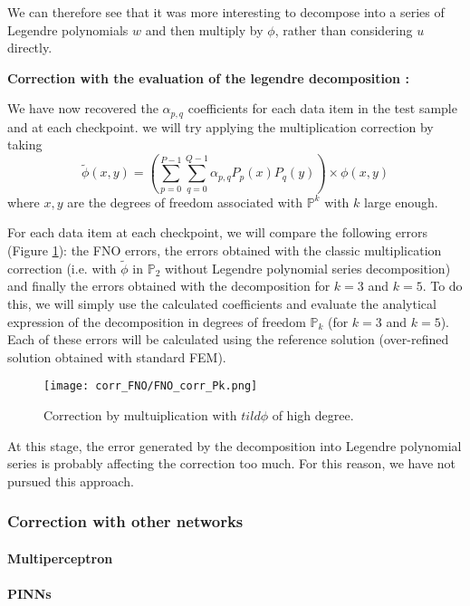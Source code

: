 We can therefore see that it was more interesting to decompose into a series of Legendre polynomials $w$ and then multiply by $\phi$, rather than considering $u$ directly.

\textbf{Correction with the evaluation of the legendre decomposition :}

We have now recovered the $\alpha_{p,q}$ coefficients for each data item in the test sample and at each checkpoint. we will try applying the multiplication correction by taking 
\begin{equation*}
	\tilde{\phi}(x,y)=\left(\sum_{p=0}^{P-1}\sum_{q=0}^{Q-1}\alpha_{p,q} P_p(x)P_q(y)\right)\times \phi(x,y)
\end{equation*}
where $x,y$ are the degrees of freedom associated with $\mathbb{P}^k$ with $k$ large enough.

For each data item at each checkpoint, we will compare the following errors (Figure \ref{FNO_corr_Pk}): the FNO errors, the errors obtained with the classic multiplication correction (i.e. with $\tilde{\phi}$ in $\mathbb{P}_2$ without Legendre polynomial series decomposition) and finally the errors obtained with the decomposition for $k=3$ and $k=5$. To do this, we will simply use the calculated coefficients and evaluate the analytical expression of the decomposition in degrees of freedom $\mathbb{P}_k$ (for $k=3$ and $k=5$). Each of these errors will be calculated using the reference solution (over-refined solution obtained with standard FEM).

\begin{figure}[H]
	\centering
	\texttt{[image: corr\_FNO/FNO\_corr\_Pk.png]}
	\caption{Correction by multuiplication with $tild{\phi}$ of high degree.}
	\label{FNO_corr_Pk}
\end{figure} 

At this stage, the error generated by the decomposition into Legendre polynomial series is probably affecting the correction too much. For this reason, we have not pursued this approach.

\subsubsection{Correction with other networks} \label{Corr.results.neural_net}

\paragraph{Multiperceptron} \label{Corr.results.neural_net.multiperceptron}

\paragraph{PINNs} \label{Corr.results.neural_net.PINNs}